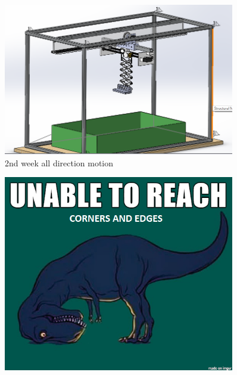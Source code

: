 \documentclass[12pt, a4paper]{beamer}
\begin{document}
	\begin{frame}
		\begin{figure}
		\begin{center}
		\includegraphics[width=0.9\textwidth]{2.png}
		\caption{2nd week all direction motion}
		\end{center}
		\end{figure}
	\end{frame}

	\begin{frame}
		\begin{figure}
		\begin{center}
		\includegraphics[width=0.9\textwidth]{unreach.png}
		\end{center}
		\end{figure}
	\end{frame}
\end{document}
